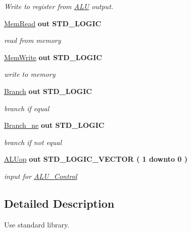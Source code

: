 \begin{DoxyCompactItemize}
\begin{DoxyCompactList}\small\item\em \-Write to register from \hyperlink{class_a_l_u}{\-A\-L\-U} output. \end{DoxyCompactList}\item 
\hyperlink{class_control_a703e49c8be2a086810119a4f32c2edd0}{\-Mem\-Read}  {\bfseries {\bfseries out }} {\bfseries \-S\-T\-D\-\_\-\-L\-O\-G\-I\-C } 
\begin{DoxyCompactList}\small\item\em read from memory \end{DoxyCompactList}\item 
\hyperlink{class_control_af268f4bd077313d14130fa77402beccb}{\-Mem\-Write}  {\bfseries {\bfseries out }} {\bfseries \-S\-T\-D\-\_\-\-L\-O\-G\-I\-C } 
\begin{DoxyCompactList}\small\item\em write to memory \end{DoxyCompactList}\item 
\hyperlink{class_control_a8bcff3a33808999c1998531a90201ac6}{\-Branch}  {\bfseries {\bfseries out }} {\bfseries \-S\-T\-D\-\_\-\-L\-O\-G\-I\-C } 
\begin{DoxyCompactList}\small\item\em branch if equal \end{DoxyCompactList}\item 
\hyperlink{class_control_a24dd763afcb5d8a8d91e3c3f5a415704}{\-Branch\-\_\-ne}  {\bfseries {\bfseries out }} {\bfseries \-S\-T\-D\-\_\-\-L\-O\-G\-I\-C } 
\begin{DoxyCompactList}\small\item\em branch if not equal \end{DoxyCompactList}\item 
\hyperlink{class_control_accc0d3f810d226b65ebd44774daada7e}{\-A\-L\-Uop}  {\bfseries {\bfseries out }} {\bfseries \-S\-T\-D\-\_\-\-L\-O\-G\-I\-C\-\_\-\-V\-E\-C\-T\-O\-R (   1    downto    0  ) } 
\begin{DoxyCompactList}\small\item\em input for \hyperlink{class_a_l_u___control}{\-A\-L\-U\-\_\-\-Control} \end{DoxyCompactList}\end{DoxyCompactItemize}


\subsection{\-Detailed \-Description}
\-Use standard library. 

